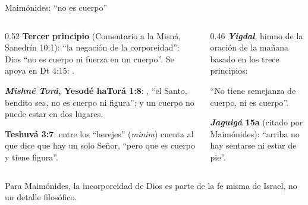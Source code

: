 \begin{frame}{Maimónides: ``no es cuerpo''}
\begin{columns}[t,onlytextwidth]
\begin{column}{0.52\textwidth}\scriptsize
\textbf{Tercer principio} (Comentario a la Misná, Sanedrín 10:1): ``la negación de la corporeidad'': Dios ``no es cuerpo ni fuerza en un cuerpo''. Se apoya en Dt 4:15: .\par\smallskip
\textbf{\emph{Mishné Torá}, Yesodé haTorá 1:8}: , ``el Santo, bendito sea, no es cuerpo ni figura''; y un cuerpo no puede estar en dos lugares.\par\smallskip
\textbf{Teshuvá 3:7}: entre los ``herejes'' (\emph{minim}) cuenta al que dice que hay un solo Señor, ``pero que es cuerpo y tiene figura''.
\end{column}
\begin{column}{0.46\textwidth}\scriptsize
\textbf{\emph{Yigdal}}, himno de la oración de la mañana basado en los trece principios:
\begin{center}\end{center}
``No tiene semejanza de cuerpo, ni es cuerpo''.\par\smallskip
\textbf{\emph{Jaguigá} 15a} (citado por Maimónides): ``arriba no hay sentarse ni estar de pie''.\par\smallskip
{}
\end{column}
\end{columns}\par\medskip
\small\RaggedRight Para Maimónides, la incorporeidad de Dios es parte de la fe misma de Israel, no un detalle filosófico.
\end{frame}

